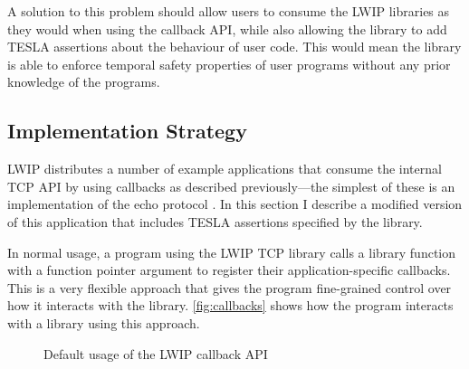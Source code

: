 A solution to this problem should allow users to consume the LWIP libraries as
they would when using the callback API, while also allowing the library to add
TESLA assertions about the behaviour of user code. This would mean the library
is able to enforce temporal safety properties of user programs without any prior
knowledge of the programs.

\subsection{Implementation Strategy}

LWIP distributes a number of example applications that consume the internal TCP
API by using callbacks as described previously---the simplest of these is an
implementation of the echo protocol \cite{RFC0862}. In this section I describe a
modified version of this application that includes TESLA assertions specified by
the library.

In normal usage, a program using the LWIP TCP library calls a library function
with a function pointer argument to register their application-specific
callbacks. This is a very flexible approach that gives the program fine-grained
control over how it interacts with the library. \autoref{fig:callbacks} shows
how the program interacts with a library using this approach.

\begin{figure}
  \centering
  \caption{Default usage of the LWIP callback API}
  \label{fig:callbacks}
\end{figure}

